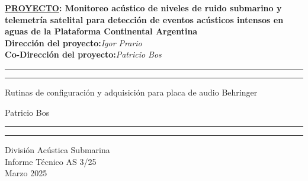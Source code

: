 \thispagestyle{empty}


	\noindent
	\begin{minipage}[c][50mm][c]{1.0\linewidth} 
		\begin{center}
			\Large{\textbf{\underline{PROYECTO}: Monitoreo acústico de niveles de ruido submarino y telemetría satelital para detección de eventos acústicos intensos en aguas de la Plataforma Continental Argentina}}\\
			\vspace{2mm}		
			\textbf{Dirección del proyecto:}\hspace{2pc}\textit{Igor Prario}\\
			\textbf{Co-Dirección del proyecto:}\hspace{2pc}\textit{Patricio Bos}\\
		\end{center}
	\end{minipage}
	\vspace{1mm}


	\noindent
	\begin{minipage}[c][70mm][c]{1.0\linewidth} 
		{\hrule\hrule}
 		\vspace{5mm}
		\begin{flushleft}
			\huge{Rutinas de configuración y adquisición para placa de audio Behringer}
		\end{flushleft}
		\vspace{8mm}
		\begin{flushright}
			\Large{Patricio Bos}\\
		\end{flushright}
		\vspace{2mm}
		{\hrule\hrule}
	\end{minipage}
	\vspace{-5mm}

	\noindent
	\begin{minipage}[c][30mm][c]{1.0\linewidth} 		
		\begin{flushright}
			\Large{División Acústica Submarina\\
				Informe Técnico AS 3/25\\
				Marzo 2025}\\
		\end{flushright}
	\end{minipage}
	\vspace{5mm}
	